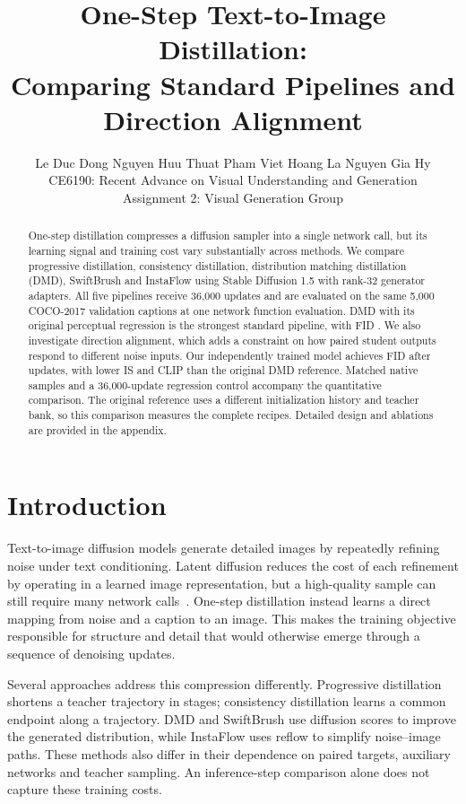 \documentclass[10pt,twocolumn,letterpaper]{article}
\title{One-Step Text-to-Image Distillation:\\Comparing Standard Pipelines and Direction Alignment}
\author{Le Duc Dong \quad Nguyen Huu Thuat \quad Pham Viet Hoang \quad La Nguyen Gia Hy\\
CE6190: Recent Advance on Visual Understanding and Generation\\
Assignment 2: Visual Generation \quad Group \AssignmentGroup}
\begin{document}
\maketitle

\begin{abstract}
One-step distillation compresses a diffusion sampler into a single network
call, but its learning signal and training cost vary substantially across
methods. We compare progressive distillation, consistency distillation,
distribution matching distillation (DMD), SwiftBrush and InstaFlow using
Stable Diffusion 1.5 with rank-32 generator adapters. All five pipelines
receive 36,000 updates and are evaluated on the same 5,000 COCO-2017
validation captions at one network function evaluation. DMD with its
original perceptual regression is the strongest standard pipeline, with
FID \ADMDFID{}. We also investigate direction alignment, which adds a
constraint on how paired student outputs respond to different noise inputs.
Our independently trained model achieves FID \ASelectedFID{} after
\ASelectedUpdates{} updates, with lower IS and CLIP than the original DMD
reference. Matched native samples and a 36,000-update regression control accompany
the quantitative comparison. The original reference uses a different
initialization history and teacher bank, so this comparison measures the
complete recipes. Detailed design and ablations are provided in the appendix.
\end{abstract}

\section{Introduction}
Text-to-image diffusion models generate detailed images by repeatedly
refining noise under text conditioning. Latent diffusion reduces the cost
of each refinement by operating in a learned image representation, but a
high-quality sample can still require many network
calls~\cite{rombach2022ldm}. One-step distillation instead learns a direct
mapping from noise and a caption to an image. This makes the training
objective responsible for structure and detail that would otherwise emerge
through a sequence of denoising updates.

Several approaches address this compression differently. Progressive
distillation shortens a teacher trajectory in stages; consistency
distillation learns a common endpoint along a trajectory. DMD and
SwiftBrush use diffusion scores to improve the generated distribution,
while InstaFlow uses reflow to simplify noise--image paths. These methods
also differ in their dependence on paired targets, auxiliary networks and
teacher sampling. An inference-step comparison alone does not capture
these training costs.
\end{document}
